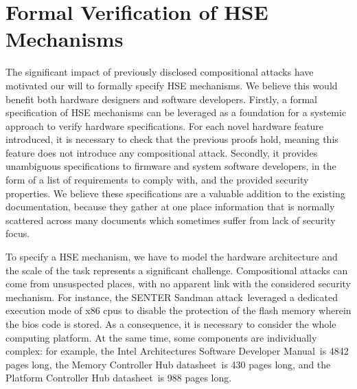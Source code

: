 \section{Formal Verification of HSE Mechanisms}
\label{sec:intro:verif}

The significant impact of previously disclosed compositional attacks  have
motivated our will to formally specify HSE mechanisms.
%
We believe this would benefit both hardware designers and software developers.
%
Firstly, a formal specification of HSE mechanisms can be leveraged as a
foundation for a systemic approach to verify hardware specifications.
%
For each novel hardware feature introduced, it is necessary to check that the
previous proofs hold, meaning this feature does not introduce any compositional
attack.
%
Secondly, it provides unambiguous specifications to firmware and system software
developers, in the form of a list of requirements to comply with, and the
provided security properties.
%
We believe these specifications are a valuable addition to the existing
documentation, because they gather at one place information that is normally
scattered across many documents which sometimes suffer from lack of security
focus. 

To specify a HSE mechanism, we have to model the hardware architecture and the
scale of the task represents a significant challenge.
%
Compositional attacks can come from unsuspected places, with no apparent link
with the considered security mechanism.
%
For instance, the SENTER Sandman attack\,\cite{kovah2015senter} leveraged a
dedicated execution mode of x86 \acp{cpu} to disable the protection of the flash
memory wherein the \ac{bios} code is stored.
%
As a consequence, it is necessary to consider the whole computing platform.
%
At the same time, some components are individually complex:
%
for example, the Intel Architectures Software Developer Manual\,\cite{intel2014manual} is
4842 pages long,
%
the Memory Controller Hub datasheet\,\cite{intel2009mch} is 430 pages long, and
%
the Platform Controller Hub datasheet\,\cite{intel2012pch} is 988 pages long.

